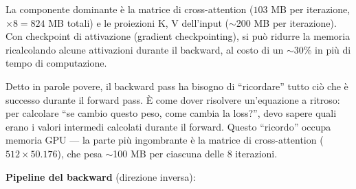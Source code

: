 \documentclass[12pt,a4paper]{article}
\begin{document}
La componente dominante \`e la matrice di cross-attention ($103$ MB per iterazione, $\times 8 = 824$ MB totali) e le proiezioni K, V dell'input ($\sim$200 MB per iterazione). Con checkpoint di attivazione (gradient checkpointing), si pu\`o ridurre la memoria ricalcolando alcune attivazioni durante il backward, al costo di un $\sim$30\% in pi\`u di tempo di computazione.

\begin{notabox}
Detto in parole povere, il backward pass ha bisogno di ``ricordare'' tutto ci\`o che \`e successo durante il forward pass. \`E come dover risolvere un'equazione a ritroso: per calcolare ``se cambio questo peso, come cambia la loss?'', devo sapere quali erano i valori intermedi calcolati durante il forward. Questo ``ricordo'' occupa memoria GPU --- la parte pi\`u ingombrante \`e la matrice di cross-attention ($512 \times 50.176$), che pesa $\sim$100 MB per ciascuna delle 8 iterazioni.
\end{notabox}

\textbf{Pipeline del backward} (direzione inversa):
\begin{center}
\small
{}
\end{center}
\end{document}
